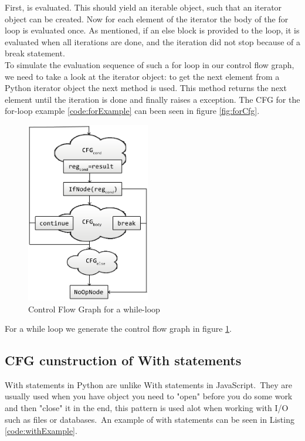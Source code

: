First,  is evaluated. This should yield an iterable object, such that an iterator object can be created. Now for each element of the iterator the body of the for loop is evaluated once. As mentioned, if an else block is provided to the loop, it is evaluated when all iterations are done, and the iteration did not stop because of a break statement. \\
To simulate the evaluation sequence of such a for loop in our control flow graph, we need to take a look at the iterator object: to get the next element from a Python iterator object the next method is used. This method returns the next element until the iteration is done and finally raises a  exception. The CFG for the for-loop example \ref{code:forExample} can been seen in figure \ref{fig:forCfg}.

\begin{figure}
	\vspace{-20pt}
	\begin{center}
		\includegraphics[width=0.48\textwidth]{images/while.png}
	\end{center}
	\vspace{-10pt}
	\caption{Control Flow Graph for a while-loop}
	\label{fig:whileCfg}
	\vspace{-10pt}
\end{figure}
For a while loop we generate the control flow graph in figure \ref{fig:whileCfg}.

\subsection{CFG cunstruction of With statements}
With statements in Python are unlike With statements in JavaScript.\ They are usually used when you have object you need to "open" before you do some work and then "close" it in the end, this pattern is used alot when working with I/O such as files or databases.\ An example of with statements can be seen in Listing \ref{code:withExample}.

